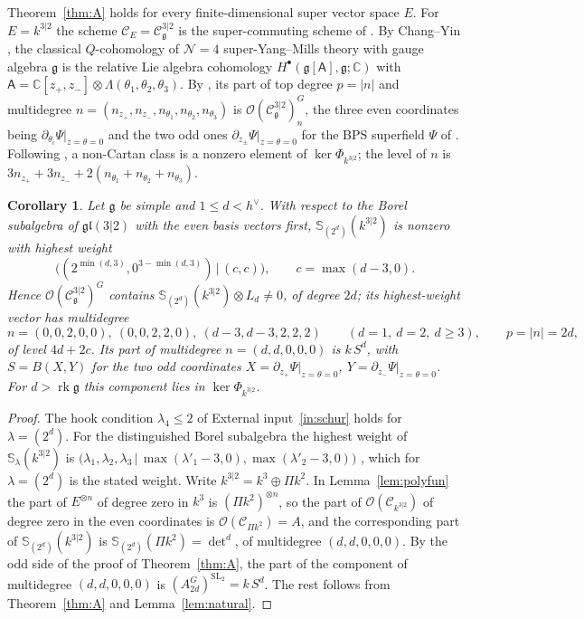 \documentclass[11pt]{article}
\newtheorem{corollary}[theorem]{Corollary}
\theoremstyle{definition}
\newcommand{\g}{\mathfrak g}
\newcommand{\Cs}{\mathcal C}
\newcommand{\Oo}{\mathcal O}
\newcommand{\rk}{\operatorname{rk}}
\newcommand{\Sf}{\mathbb S}
\newcommand{\hv}{h^\vee}
\DeclareMathOperator{\SL}{SL}
\begin{document}
Theorem~\ref{thm:A} holds for every finite-dimensional super vector space $E$. For $E=k^{3|2}$ the scheme $\Cs_E=\Cs^{3|2}_\g$ is the super-commuting scheme of \cite[\S2]{Ch26}. By Chang--Yin \cite{CY13}, the classical $Q$-cohomology of $\mathcal N=4$ super-Yang--Mills theory with gauge algebra $\g$ is the relative Lie algebra cohomology $H^\bullet(\g[\mathsf A],\g;\mathbb C)$ with $\mathsf A=\mathbb C[z_+,z_-]\otimes\Lambda(\theta_1,\theta_2,\theta_3)$. By \cite[Prop.~4]{Ch26}, its part of top degree $p=|n|$ and multidegree $n=(n_{z_+},n_{z_-},n_{\theta_1},n_{\theta_2},n_{\theta_3})$ is $\Oo(\Cs^{3|2}_\g)^G_n$, the three even coordinates being $\partial_{\theta_i}\Psi|_{z=\theta=0}$ and the two odd ones $\partial_{z_\pm}\Psi|_{z=\theta=0}$ for the BPS superfield $\Psi$ of \cite[\S3]{Ch26}. Following \cite[Def.~1]{Ch26}, a non-Cartan class is a nonzero element of $\ker\Phi_{k^{3|2}}$; the level of $n$ is $3n_{z_+}+3n_{z_-}+2(n_{\theta_1}+n_{\theta_2}+n_{\theta_3})$.

\begin{corollary}\label{cor:N4}
Let $\g$ be simple and $1\le d<\hv$. With respect to the Borel subalgebra of $\mathfrak{gl}(3|2)$ with the even basis vectors first, $\Sf_{(2^d)}(k^{3|2})$ is nonzero with highest weight
\[
\bigl((2^{\min(d,3)},0^{3-\min(d,3)})\,\big|\,(c,c)\bigr),\qquad c=\max(d-3,0).
\] Hence $\Oo(\Cs^{3|2}_\g)^G$ contains $\Sf_{(2^d)}(k^{3|2})\otimes L_d\neq0$, of degree $2d$; its highest-weight vector has multidegree
\[
n=(0,0,2,0,0),\ (0,0,2,2,0),\ (d-3,d-3,2,2,2)\qquad (d=1,\ d=2,\ d\ge3),\qquad p=|n|=2d,
\]
of level $4d+2c$. Its part of multidegree $n=(d,d,0,0,0)$ is $k\,S^d$, with $S=B(X,Y)$ for the two odd coordinates $X=\partial_{z_+}\Psi|_{z=\theta=0}$, $Y=\partial_{z_-}\Psi|_{z=\theta=0}$. For $d>\rk\g$ this component lies in $\ker\Phi_{k^{3|2}}$.
\end{corollary}
\begin{proof}
The hook condition $\lambda_4\le2$ of External input~\ref{in:schur} holds for $\lambda=(2^d)$. For the distinguished Borel subalgebra the highest weight of $\Sf_\lambda(k^{3|2})$ is $\bigl(\lambda_1,\lambda_2,\lambda_3\,\big|\,\max(\lambda'_1-3,0),\max(\lambda'_2-3,0)\bigr)$ \cite{BR87}, which for $\lambda=(2^d)$ is the stated weight. Write $k^{3|2}=k^3\oplus\Pi k^2$. In Lemma~\ref{lem:polyfun} the part of $E^{\otimes n}$ of degree zero in $k^3$ is $(\Pi k^2)^{\otimes n}$, so the part of $\Oo(\Cs_{k^{3|2}})$ of degree zero in the even coordinates is $\Oo(\Cs_{\Pi k^2})=A$, and the corresponding part of $\Sf_{(2^d)}(k^{3|2})$ is $\Sf_{(2^d)}(\Pi k^2)=\det^d$, of multidegree $(d,d,0,0,0)$. By the odd side of the proof of Theorem~\ref{thm:A}, the part of the component of multidegree $(d,d,0,0,0)$ is $(A^G_{2d})^{\SL_2}=k\,S^d$. The rest follows from Theorem~\ref{thm:A} and Lemma~\ref{lem:natural}.
\end{proof}
\end{document}
